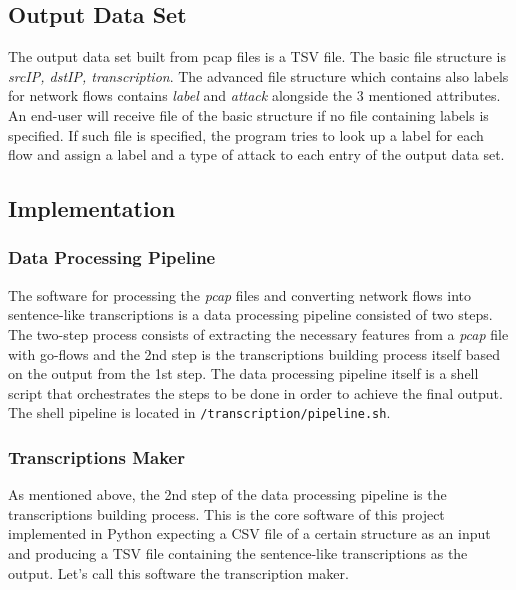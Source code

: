 \documentclass{article}
\begin{document}

\subsection{Output Data Set}

The output data set built from pcap files is a TSV file. The basic file structure is \textit{srcIP, dstIP, transcription}. The advanced file structure which contains also labels for network flows contains \textit{label} and \textit{attack} alongside the 3 mentioned attributes. An end-user will receive file of the basic structure if no file containing labels is specified. If such file is specified, the program tries to look up a label for each flow and assign a label and a type of attack to each entry of the output data set.



\subsection{Implementation}

\subsubsection{Data Processing Pipeline}
The software for processing the \textit{pcap} files and converting network flows into sentence-like transcriptions is a data processing pipeline consisted of two steps. The two-step process consists of extracting the necessary features from a \textit{pcap} file with go-flows and the 2nd step is the transcriptions building process itself based on the output from the 1st step. The data processing pipeline itself is a shell script that orchestrates the steps to be done in order to achieve the final output. The shell pipeline is located in \verb|/transcription/pipeline.sh|.


\subsubsection{Transcriptions Maker}
As mentioned above, the 2nd step of the data processing pipeline is the transcriptions building process. This is the core software of this project implemented in Python expecting a CSV file of a certain structure as an input and producing a TSV file containing the sentence-like transcriptions as the output. Let's call this software the transcription maker.
\end{document}
